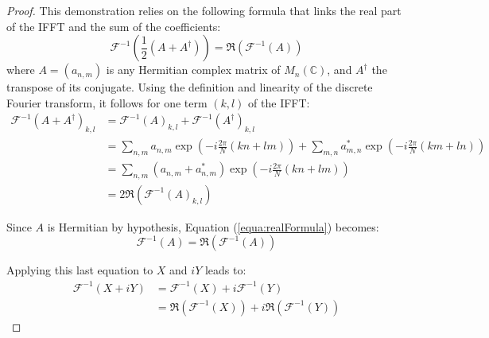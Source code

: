 \documentclass[final]{jcgt}
\begin{document}
\begin{proof}
	This demonstration relies on the following formula that links the real part of the IFFT and the sum of the coefficients:
	\begin{equation}
		\label{equa:realFormula}
		\mathcal{F}^{-1}\left(\frac{1}{2}\left(A+A^{\dagger}\right)\right) =
		\Re\left(\mathcal{F}^{-1}\left(A\right)\right)
	\end{equation}
	where $A=(a_{n,m})$ is any Hermitian complex matrix of $M_n(\mathbb{C})$, and $A^{\dagger}$ the transpose of its conjugate.
	Using the definition and linearity of the discrete Fourier transform, it follows for one term $(k,l)$ of the IFFT:
	\begin{align}
		\mathcal{F}^{-1}\left(A+A^{\dagger}\right)_{k,l} & =
		\mathcal{F}^{-1}\left(A\right)_{k,l} + \mathcal{F}^{-1}\left(A^{\dagger}\right)_{k,l}\nonumber                                                                                                                  \\
		                                                 & =\sum_{n,m}a_{n,m}\exp\left(-i\frac{2\pi}{N}\left(kn+lm\right)\right) + \sum_{m,n}a_{m,n}^{\ast}\exp\left(-i\frac{2\pi}{N}\left(km+ln\right)\right)\nonumber \\
		                                                 & =\sum_{n,m}(a_{n,m}+a_{n,m}^{\ast})\exp\left(-i\frac{2\pi}{N}\left(kn+lm\right)\right)\nonumber                                                              \\
		                                                 & = 2\Re\left(\mathcal{F}^{-1}\left(A\right)_{k,l}\right)
	\end{align}

	Since $A$ is Hermitian by hypothesis, Equation (\ref{equa:realFormula}) becomes:
	\begin{equation}
		\mathcal{F}^{-1}\left(A\right) = \Re\left(\mathcal{F}^{-1}\left(A\right)\right)
	\end{equation}

	Applying this last equation to $X$ and $iY$ leads to:
	\begin{equation}
		\begin{aligned}
			\mathcal{F}^{-1}\left(X+iY\right) & =
			\mathcal{F}^{-1}\left(X\right) + i\mathcal{F}^{-1}\left(Y\right)                                                                       \\
			                                  & = \Re\left(\mathcal{F}^{-1}\left(X\right)\right) + i\Re\left(\mathcal{F}^{-1}\left(Y\right)\right)
		\end{aligned}
	\end{equation}


\end{proof}
\afterdoc
\end{document}
